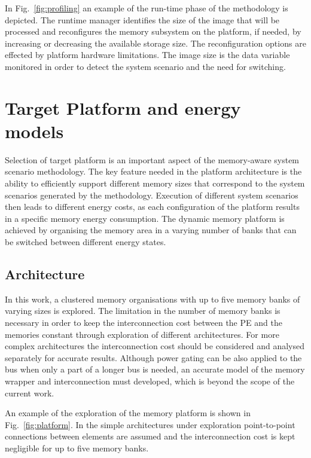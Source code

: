 \documentclass{acm_proc_article-sp}
\begin{document}
In Fig.~\ref{fig:profiling} an example of the run-time phase of the methodology is depicted. The runtime manager identifies the size of the image that will be processed and reconfigures the memory subsystem on the platform, if needed, by increasing or decreasing the available storage size. The reconfiguration options are effected by platform hardware limitations. The image size is the data variable monitored in order to detect the system scenario and the need for switching.

\section{Target Platform and energy \\ models}
\label{sec:platform}

Selection of target platform is an important aspect of the memory-aware system scenario methodology. The key feature needed in the platform architecture is the ability to efficiently support different memory sizes that correspond to the system scenarios generated by the methodology. Execution of different system scenarios then leads to different energy costs, as each configuration of the platform results in a specific memory energy consumption. The dynamic memory platform is achieved by organising the memory area in a varying number of banks that can be switched between different energy states. 

\subsection{Architecture}

In this work, a clustered memory organisations with up to five memory banks of varying sizes is explored. The limitation in the number of memory banks is necessary in order to keep the interconnection cost between the PE and the memories constant through exploration of different architectures. For more complex architectures the interconnection cost should be considered and analysed separately for accurate results. Although power gating can be also applied to the bus when only a part of a longer bus is needed, an accurate model of the memory wrapper and interconnection must developed, which is beyond the scope of the current work. 

An example of the exploration of the memory platform is shown in Fig.~\ref{fig:platform}. In the simple architectures under exploration point-to-point connections between elements are assumed and the interconnection cost is kept negligible for up to five memory banks.
\end{document}
